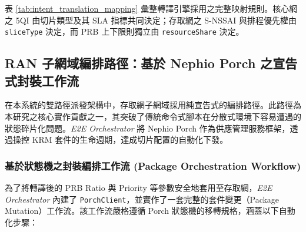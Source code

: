 表 \ref{tab:intent_translation_mapping} 彙整轉譯引擎採用之完整映射規則。核心網之 5QI 由切片類型及其 SLA 指標共同決定；存取網之 S-NSSAI 與排程優先權由 \texttt{sliceType} 決定，而 PRB 上下限則獨立由 \texttt{resourceShare} 決定。

\begin{table}[htbp]
    \centering
    \caption{意圖至 Core 與 RAN 網域參數之完整映射}
    \label{tab:intent_translation_mapping}
    \small
\end{table}

\subsection{RAN 子網域編排路徑：基於 Nephio Porch 之宣告式封裝工作流}
\label{subsec:ran_orchestration_path}

在本系統的雙路徑派發架構中，存取網子網域採用純宣告式的編排路徑。此路徑為本研究之核心實作貢獻之一，其突破了傳統命令式腳本在分散式環境下容易遭遇的狀態碎片化問題。\textit{E2E Orchestrator} 將 Nephio Porch 作為供應管理服務框架，透過操控 KRM 套件的生命週期，達成切片配置的自動化下發。

\subsubsection{基於狀態機之封裝編排工作流 (Package Orchestration Workflow)}
為了將轉譯後的 PRB Ratio 與 Priority 等參數安全地套用至存取網，\textit{E2E Orchestrator} 內建了 \texttt{PorchClient}，並實作了一套完整的套件變更（Package Mutation）工作流。該工作流嚴格遵循 Porch 狀態機的移轉規格，涵蓋以下自動化步驟：

